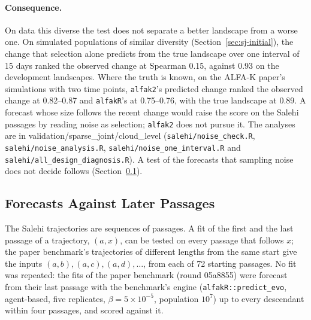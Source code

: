\documentclass[11pt]{article}
\begin{document}
\paragraph{Consequence.} On data this diverse the test does not separate a
better landscape from a worse one. On simulated populations of similar
diversity (Section~\ref{sec:sj-initial}), the change that selection alone
predicts from the true landscape over one interval of 15 days ranked the
observed change at Spearman 0.15, against 0.93 on the development landscapes.
Where the truth is known, on the ALFA-K paper's simulations with two time
points, \texttt{alfak2}'s predicted change ranked the observed change at
0.82--0.87 and \texttt{alfakR}'s at 0.75--0.76, with the true landscape at
0.89. A forecast whose size follows the recent change would raise the score on
the Salehi passages by reading noise as selection; \texttt{alfak2} does not
pursue it. The analyses are in validation/sparse\_joint/cloud\_level
(\texttt{salehi/noise\_check.R}, \texttt{salehi/noise\_analysis.R},
\texttt{salehi/noise\_one\_interval.R} and
\texttt{salehi/all\_design\_diagnosis.R}). A test of the forecasts that
sampling noise does not decide follows (Section~\ref{sec:salehi-horizon}).

\subsection{Forecasts Against Later Passages}
\label{sec:salehi-horizon}

The Salehi trajectories are sequences of passages. A fit of the first and the
last passage of a trajectory, $(a,x)$, can be tested on every passage that
follows $x$; the paper benchmark's trajectories of different lengths from the
same start give the inputs $(a,b), (a,c), (a,d), \dots$, from each of 72
starting passages. No fit was repeated: the fits of the paper benchmark (round
05a8855) were forecast from their last passage with the benchmark's engine
(\texttt{alfakR::predict\_evo}, agent-based, five replicates, $\beta=5\times
10^{-5}$, population $10^7$) up to every descendant within four passages, and
scored against it.
\end{document}
